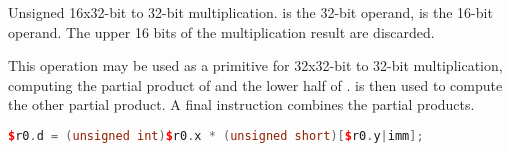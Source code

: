 \noindent Unsigned 16x32-bit to 32-bit multiplication.  is the 32-bit operand,
\code{[$r0.y|imm]} is the 16-bit operand. The upper 16 bits of the multiplication result
are discarded.

This operation may be used as a primitive for 32x32-bit to 32-bit
multiplication, computing the partial product of  and the lower half
of \code{[$r0.y|imm]}.  is then used to compute the other partial product. A
final  instruction combines the partial products.

\begin{lstlisting}[numbers=none, basicstyle=\ttfamily\footnotesize, language=C++]
$r0.d = (unsigned int)$r0.x * (unsigned short)[$r0.y|imm];
\end{lstlisting}

\vskip 10pt
\noindent\begin{minipage}{\textwidth}
\label{opc:MPYH}
\noindent\textbf{\footnotesize\texttt{}}

\noindent\textbf{\footnotesize\texttt{}}


\end{minipage}
